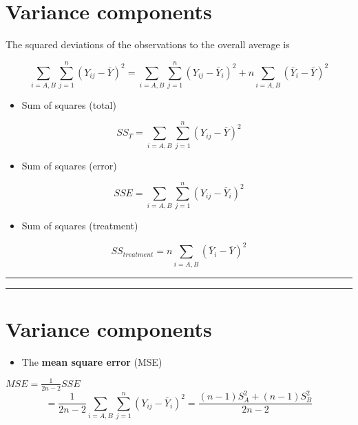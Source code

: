 \documentclass[
]{book}
\providecommand{\tightlist}{%
  \setlength{\itemsep}{0pt}\setlength{\parskip}{0pt}}
\begin{document}
\hypertarget{variance-components}{%
\section{Variance components}\label{variance-components}}

The squared deviations of the observations to the overall average is

\[\sum_{i=A,B}\sum_{j=1}^n(Y_{ij}-\bar{Y})^2= \sum_{i=A,B}\sum_{j=1}^n(Y_{ij}-\bar{Y}_i)^2+n\sum_{i=A,B}(\bar{Y}_{i}-\bar{Y})^2\]

\begin{itemize}
\tightlist
\item
  Sum of squares (total)
\end{itemize}

\[SS_T=\sum_{i=A,B}\sum_{j=1}^n(Y_{ij}-\bar{Y})^2\]

\begin{itemize}
\tightlist
\item
  Sum of squares (error)
\end{itemize}

\[SSE=\sum_{i=A,B}\sum_{j=1}^n(Y_{ij}-\bar{Y}_i)^2\]

\begin{itemize}
\tightlist
\item
  Sum of squares (treatment)
\end{itemize}

\[SS_{treatment}=n\sum_{i=A,B}(\bar{Y}_{i}-\bar{Y})^2\]

\begin{center}\rule{0.5\linewidth}{0.5pt}\end{center}

\begin{center}\rule{0.5\linewidth}{0.5pt}\end{center}

\hypertarget{variance-components-1}{%
\section{Variance components}\label{variance-components-1}}

\begin{itemize}
\tightlist
\item
  The \textbf{mean square error} (MSE)
\end{itemize}

\(MSE=\frac{1}{2n-2} SSE\) \[= \frac{1}{2n-2} \sum_{i=A,B}\sum_{j=1}^n(Y_{ij}-\bar{Y}_i)^2= \frac{(n-1)S_A^2+(n-1)S_B^2}{2n-2}\]
\end{document}
